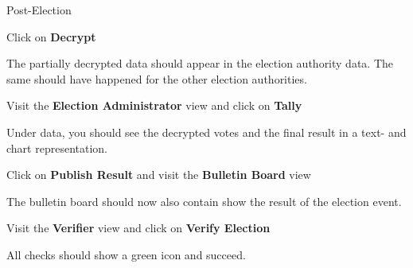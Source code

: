 \begin{testcase}{Post-Election}
{				\item Click on \textbf{Decrypt}	
				\item The partially decrypted data should appear in the election authority data. The same should have happened for the other election authorities.
				\item Visit the \textbf{Election Administrator} view and click on \textbf{Tally}
				\item Under data, you should see the decrypted votes and the final result in a text- and chart representation.
				\item Click on \textbf{Publish Result} and visit the \textbf{Bulletin Board} view
				\item The bulletin board should now also contain show the result of the election event.
				\item Visit the \textbf{Verifier} view and click on \textbf{Verify Election}
				\item All checks should show a green icon and succeed.
				}							
\end{testcase}




